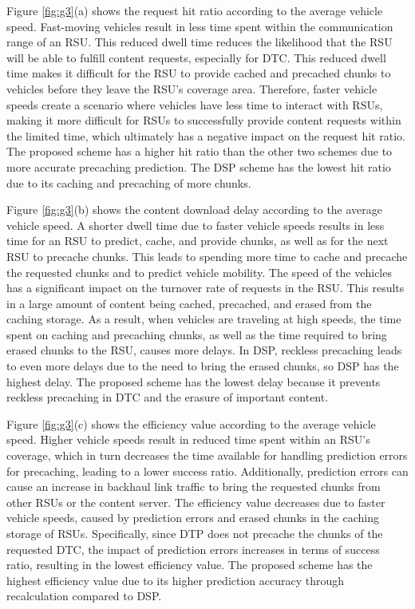 \documentclass[journal]{IEEEtran}
\begin{document}
Figure \ref{fig:g3}(a) shows the request hit ratio according to the average vehicle speed.
Fast-moving vehicles result in less time spent within the communication range of an RSU.
This reduced dwell time reduces the likelihood that the RSU will be able to fulfill content requests, especially for DTC.
This reduced dwell time makes it difficult for the RSU to provide cached and precached chunks to vehicles before they leave the RSU's coverage area.
Therefore, faster vehicle speeds create a scenario where vehicles have less time to interact with RSUs, making it more difficult for RSUs to successfully provide content requests within the limited time, which ultimately has a negative impact on the request hit ratio.
The proposed scheme has a higher hit ratio than the other two schemes due to more accurate precaching prediction.
The DSP scheme has the lowest hit ratio due to its caching and precaching of more chunks.

Figure \ref{fig:g3}(b) shows the content download delay according to the average vehicle speed.
A shorter dwell time due to faster vehicle speeds results in less time for an RSU to predict, cache, and provide chunks, as well as for the next RSU to precache chunks.
This leads to spending more time to cache and precache the requested chunks and to predict vehicle mobility.
The speed of the vehicles has a significant impact on the turnover rate of requests in the RSU.
This results in a large amount of content being cached, precached, and erased from the caching storage.
As a result, when vehicles are traveling at high speeds, the time spent on caching and precaching chunks, as well as the time required to bring erased chunks to the RSU, causes more delays.
In DSP, reckless precaching leads to even more delays due to the need to bring the erased chunks, so DSP has the highest delay.
The proposed scheme has the lowest delay because it prevents reckless precaching in DTC and the erasure of important content.

Figure \ref{fig:g3}(c) shows the efficiency value according to the average vehicle speed.
Higher vehicle speeds result in reduced time spent within an RSU's coverage, which in turn decreases the time available for handling prediction errors for precaching, leading to a lower success ratio.
Additionally, prediction errors can cause an increase in backhaul link traffic to bring the requested chunks from other RSUs or the content server.
The efficiency value decreases due to faster vehicle speeds, caused by prediction errors and erased chunks in the caching storage of RSUs.
Specifically, since DTP does not precache the chunks of the requested DTC, the impact of prediction errors increases in terms of success ratio, resulting in the lowest efficiency value.
The proposed scheme has the highest efficiency value due to its higher prediction accuracy through recalculation compared to DSP.
\end{document}
